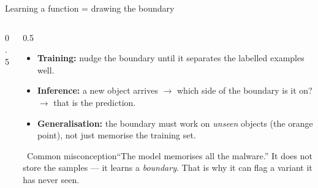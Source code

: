 \documentclass[aspectratio=169,10pt]{beamer}
\newcommand{\mlterm}[1]{{\color{accent}\textsf{\textbf{#1}}}} %
\newcommand{\myth}[1]{%
  \begin{alertblock}{\small\ding{55}\ Common misconception}\small #1\end{alertblock}}
\begin{document}
\begin{frame}{Learning a function = drawing the boundary}
  \begin{columns}[T]
    \begin{column}{0.5\textwidth}
      \centering
    \end{column}
    \begin{column}{0.5\textwidth}
      \begin{itemize}\small
        \item \mlterm{Training:} nudge the boundary until it separates the
              labelled examples well.
        \item \mlterm{Inference:} a new object arrives $\to$ which side of the
              boundary is it on? $\to$ that is the prediction.
        \item \mlterm{Generalisation:} the boundary must work on \emph{unseen}
              objects (the orange point), not just memorise the training set.
      \end{itemize}
      \myth{``The model memorises all the malware.'' It does not store the
      samples --- it learns a \emph{boundary}. That is why it can flag a variant
      it has never seen.}
    \end{column}
  \end{columns}
\end{frame}
\end{document}
